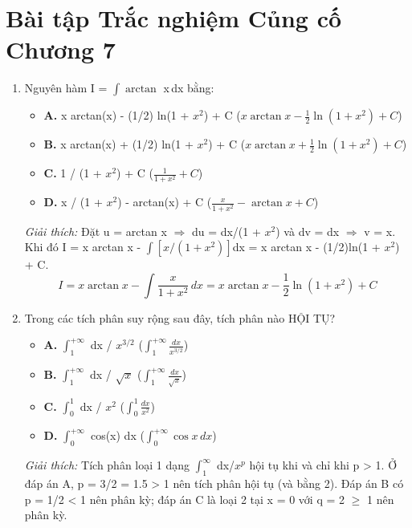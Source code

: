 \documentclass[11pt,a4paper,oneside]{book}
\begin{document}
\section{Bài tập Trắc nghiệm Củng cố Chương 7}
\begin{enumerate}[label=\textbf{Câu \arabic*:}, leftmargin=2.2em, itemsep=8pt]
  \item Nguyên hàm I = $\int \arctan$ x\,dx bằng:
  \begin{itemize}[label={}, leftmargin=1em, itemsep=2pt]
    \item \textbf{A.} x arctan(x) - (1/2) ln(1 + $x^2$) + C \quad ($x\arctan x - \frac{1}{2}\ln(1+x^2) + C$)
    \item \textbf{B.} x arctan(x) + (1/2) ln(1 + $x^2$) + C \quad ($x\arctan x + \frac{1}{2}\ln(1+x^2) + C$)
    \item \textbf{C.} 1 / (1 + $x^2$) + C \quad ($\frac{1}{1+x^2} + C$)
    \item \textbf{D.} x / (1 + $x^2$) - arctan(x) + C \quad ($\frac{x}{1+x^2} - \arctan x + C$)
  \end{itemize}
  \vspace{2pt}
   \textit{Giải thích:} Đặt u = arctan x $\Rightarrow$  du = dx/(1 + $x^2$) và dv = dx $\Rightarrow$  v = x. Khi đó I = x arctan x - $\int [x / (1 + x^2)]$dx = x arctan x - (1/2)ln(1 + $x^2$) + C.
  \[ I = x\arctan x - \int \frac{x}{1+x^2}\,dx = x\arctan x - \frac{1}{2}\ln(1+x^2) + C \]
  \item Trong các tích phân suy rộng sau đây, tích phân nào HỘI TỤ?
  \begin{itemize}[label={}, leftmargin=1em, itemsep=2pt]
    \item \textbf{A.} $\int_1^{+\infty}$ dx / $x^{3/2}$ \quad ($\int_1^{+\infty} \frac{dx}{x^{3/2}}$)
    \item \textbf{B.} $\int_1^{+\infty}$ dx / $\sqrt{x}$ \quad ($\int_1^{+\infty} \frac{dx}{\sqrt{x}}$)
    \item \textbf{C.} $\int_0^1$ dx / $x^2$ \quad ($\int_0^1 \frac{dx}{x^2}$)
    \item \textbf{D.} $\int_0^{+\infty}$ cos(x) dx \quad ($\int_0^{+\infty} \cos x\,dx$)
  \end{itemize}
  \vspace{2pt}
   \textit{Giải thích:} Tích phân loại 1 dạng $\int_1^\infty$ dx/$x^p$ hội tụ khi và chỉ khi p > 1. Ở đáp án A, p = 3/2 = 1.5 > 1 nên tích phân hội tụ (và bằng 2). Đáp án B có p = 1/2 < 1 nên phân kỳ; đáp án C là loại 2 tại x = 0 với q = 2 $\ge$  1 nên phân kỳ.

\end{enumerate}
\end{document}
